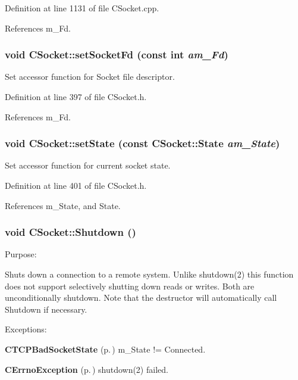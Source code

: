 Definition at line 1131 of file CSocket.cpp.

References m\_\-Fd.
\subsubsection{\setlength{\rightskip}{0pt plus 5cm}void CSocket::set\-Socket\-Fd (const int {\em am\_\-Fd})\hspace{0.3cm}{\tt  [inline, protected]}}\label{classCSocket_b0}


Set accessor function for Socket file descriptor.



Definition at line 397 of file CSocket.h.

References m\_\-Fd.
\subsubsection{\setlength{\rightskip}{0pt plus 5cm}void CSocket::set\-State (const {\bf CSocket::State} {\em am\_\-State})\hspace{0.3cm}{\tt  [inline, protected]}}\label{classCSocket_b1}


Set accessor function for current socket state.



Definition at line 401 of file CSocket.h.

References m\_\-State, and State.
\subsubsection{\setlength{\rightskip}{0pt plus 5cm}void CSocket::Shutdown ()}\label{classCSocket_a10}


Purpose:

Shuts down a connection to a remote system. Unlike shutdown(2) this function does not support selectively shutting down reads or writes. Both are unconditionally shutdown. Note that the destructor will automatically call Shutdown if necessary.

Exceptions:\begin{CompactItemize}
\item 
{\bf CTCPBad\-Socket\-State} {\rm (p.\,\pageref{classCTCPBadSocketState})} m\_\-State != Connected.\item 
{\bf CErrno\-Exception} {\rm (p.\,\pageref{classCErrnoException})} shutdown(2) failed. \end{CompactItemize}


